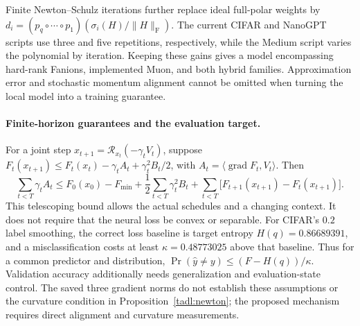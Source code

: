 Finite Newton--Schulz iterations further replace ideal full-polar weights
by $d_i=(p_q\circ\cdots\circ p_1)(\sigma_i(H)/\|H\|_{\mathrm F})$.
The current CIFAR and NanoGPT scripts use three and five repetitions,
respectively, while the Medium script varies the polynomial by iteration.
Keeping these gains gives a model encompassing hard-rank Fanions,
implemented Muon, and both hybrid families. Approximation error and
stochastic momentum alignment cannot be omitted when turning the local
model into a training guarantee.

\paragraph{Finite-horizon guarantees and the evaluation target.}
For a joint step $x_{t+1}=\mathcal R_{x_t}(-\gamma_tV_t)$, suppose
$F_t(x_{t+1})\leq F_t(x_t)-\gamma_tA_t+\gamma_t^2B_t/2$, with
$A_t=\langle\operatorname{grad}F_t,V_t\rangle$. Then
\begin{equation}\label{tadl:finite}
 \sum_{t<T}\gamma_t A_t
 \leq F_0(x_0)-F_{\min}+\frac12\sum_{t<T}\gamma_t^2B_t
       +\sum_{t<T}\big[F_{t+1}(x_{t+1})-F_t(x_{t+1})\big].
\end{equation}
This telescoping bound allows the actual schedules and a changing context.
It does not require that the neural loss be convex or separable.
For CIFAR's $0.2$ label smoothing, the correct loss baseline is target
entropy $H(q)=0.86689391$, and a misclassification costs at least
$\kappa=0.48773025$ above that baseline. Thus for a common predictor and
distribution, $\Pr(\widehat y\ne y)\leq(F-H(q))/\kappa$.
Validation accuracy additionally needs generalization and evaluation-state
control. The saved three gradient norms do not establish these assumptions
or the curvature condition in Proposition~\ref{tadl:newton}; the proposed
mechanism requires direct alignment and curvature measurements.
